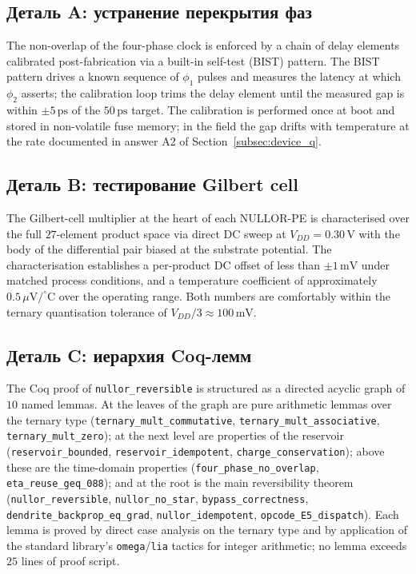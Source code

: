 \subsection{Деталь A: устранение перекрытия фаз}
\label{subsec:appA}

The non-overlap of the four-phase clock is enforced by a chain of delay elements
calibrated post-fabrication via a built-in self-test (BIST) pattern.  The BIST
pattern drives a known sequence of $\phi_1$ pulses and measures the latency at
which $\phi_2$ asserts; the calibration loop trims the delay element until the
measured gap is within $\pm 5\,\text{ps}$ of the $50\,\text{ps}$ target.  The
calibration is performed once at boot and stored in non-volatile fuse memory; in
the field the gap drifts with temperature at the rate documented in answer A2
of Section~\ref{subsec:device_q}.

\subsection{Деталь B: тестирование Gilbert cell}
\label{subsec:appB}

The Gilbert-cell multiplier at the heart of each NULLOR-PE is characterised over
the full $27$-element product space via direct DC sweep at $V_{DD} = 0.30\,\text{V}$
with the body of the differential pair biased at the substrate potential.  The
characterisation establishes a per-product DC offset of less than $\pm 1\,\text{mV}$
under matched process conditions, and a temperature coefficient of approximately
$0.5\,\mu\text{V}/^\circ\text{C}$ over the operating range.  Both numbers are
comfortably within the ternary quantisation tolerance of $V_{DD}/3 \approx
100\,\text{mV}$.

\subsection{Деталь C: иерархия Coq-лемм}
\label{subsec:appC}

The Coq proof of \texttt{nullor\_reversible} is structured as a directed acyclic
graph of $10$ named lemmas.  At the leaves of the graph are pure arithmetic lemmas
over the ternary type (\texttt{ternary\_mult\_commutative},
\texttt{ternary\_mult\_associative}, \texttt{ternary\_mult\_zero}); at the next
level are properties of the reservoir (\texttt{reservoir\_bounded},
\texttt{reservoir\_idempotent}, \texttt{charge\_conservation}); above these are
the time-domain properties (\texttt{four\_phase\_no\_overlap},
\texttt{eta\_reuse\_geq\_088}); and at the root is the main reversibility theorem
(\texttt{nullor\_reversible}, \texttt{nullor\_no\_star},
\texttt{bypass\_correctness}, \texttt{dendrite\_backprop\_eq\_grad},
\texttt{nullor\_idempotent}, \texttt{opcode\_E5\_dispatch}).
Each lemma is proved by direct case analysis on the ternary type and by
application of the standard library's \texttt{omega}/\texttt{lia} tactics for
integer arithmetic; no lemma exceeds $25$ lines of proof script.

